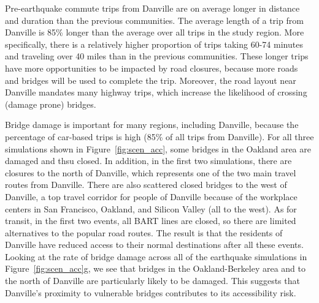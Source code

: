 
Pre-earthquake commute trips from Danville are on average longer in distance and duration than the previous communities. The average length of a trip from Danville is 85\% longer than the average over all trips in the study region. More specifically, there is a relatively higher proportion of trips taking 60-74 minutes and traveling over 40 miles than in the previous communities. These longer trips have more opportunities to be impacted by road closures, because more roads and bridges will be used to complete the trip. Moreover, the road layout near Danville mandates many highway trips, which increase the likelihood of crossing (damage prone) bridges. 


Bridge damage is important for many regions, including Danville, because the percentage of car-based trips is high (85\% of all trips from Danville). For all three simulations shown in Figure~\ref{fig:scen_acc}, some bridges in the Oakland area are damaged and thsu closed. In addition, in the first two simulations, there are closures to the north of Danville, which represents one of the two main travel routes from Danville. There are also scattered closed bridges to the west of Danville, a top travel corridor for people of Danville because of the workplace centers in San Francisco, Oakland, and Silicon Valley (all to the west). As for transit, in the first two events, all BART lines are closed, so there are limited alternatives to the popular road routes. The result is that the residents of Danville have reduced access to their normal destinations after all these events. 
Looking at the rate of bridge damage across all of the earthquake simulations in Figure~\ref{fig:scen_acc}{g}, we see that bridges in the Oakland-Berkeley area and to the north of Danville are particularly likely to be damaged. This suggests that Danville's proximity to  vulnerable bridges contributes to its accessibility risk.

